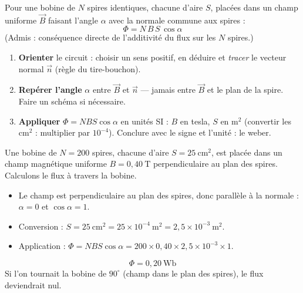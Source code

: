 \documentclass[11pt]{article}
\begin{document}
\begin{propriete}
Pour une bobine de $N$ spires identiques, chacune d'aire $S$, placées dans un champ uniforme $\vec{B}$ faisant l'angle $\alpha$ avec la normale commune aux spires :
\[ \Phi = N\,B\,S\,\cos\alpha \]
(Admis : conséquence directe de l'additivité du flux sur les $N$ spires.)
\end{propriete}

\begin{methode}
\begin{enumerate}
\item \textbf{Orienter} le circuit : choisir un sens positif, en déduire et \emph{tracer} le vecteur normal $\vec{n}$ (règle du tire-bouchon).
\item \textbf{Repérer l'angle} $\alpha$ entre $\vec{B}$ et $\vec{n}$ — jamais entre $\vec{B}$ et le plan de la spire. Faire un schéma si nécessaire.
\item \textbf{Appliquer} $\Phi = N B S \cos\alpha$ en unités SI : $B$ en tesla, $S$ en m$^2$ (convertir les cm$^2$ : multiplier par $10^{-4}$). Conclure avec le signe et l'unité : le weber.
\end{enumerate}
\end{methode}

\begin{exemplebox}
Une bobine de $N = 200$ spires, chacune d'aire $S = 25\ \mathrm{cm}^2$, est placée dans un champ magnétique uniforme $B = 0{,}40\ \mathrm{T}$ perpendiculaire au plan des spires. Calculons le flux à travers la bobine.
\begin{itemize}
\item Le champ est perpendiculaire au plan des spires, donc parallèle à la normale : $\alpha = 0$ et $\cos\alpha = 1$.
\item Conversion : $S = 25\ \mathrm{cm}^2 = 25\times 10^{-4}\ \mathrm{m}^2 = 2{,}5\times 10^{-3}\ \mathrm{m}^2$.
\item Application : $\Phi = N B S \cos\alpha = 200 \times 0{,}40 \times 2{,}5\times 10^{-3} \times 1$.
\end{itemize}
\[ \boxed{\Phi = 0{,}20\ \mathrm{Wb}} \]
Si l'on tournait la bobine de $90^\circ$ (champ dans le plan des spires), le flux deviendrait nul.
\end{exemplebox}
\end{document}
